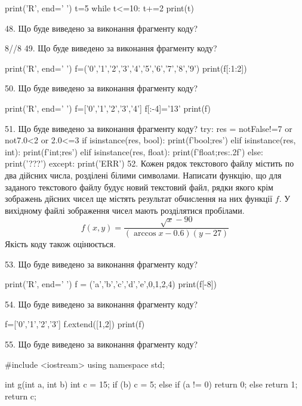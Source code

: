 \documentclass[11pt]{article}
\begin{document}
print('R', end=' ')
t=5
while t<=10:
    t+=2
print(t)

\vspace{5mm}
48. Що буде виведено за виконання фрагменту коду?

8//8%
\vspace{5mm}
49. Що буде виведено за виконання фрагменту коду?

print('R', end=' ')
f=('0','1','2','3','4','5','6','7','8','9')
print(f[:1:2])

\vspace{5mm}
50. Що буде виведено за виконання фрагменту коду?

print('R', end=' ')
f=['0','1','2','3','4']
f[:-4]='13'
print(f)

\vspace{5mm}
51. Що буде виведено за виконання фрагменту коду?
try:
    res = notFalse!=7 or not7.0<2 or 2.0<=3
    if isinstance(res, bool):
        print(f'bool;{res}')
    elif isinstance(res, int):
        print(f'int;{res}')
    elif isinstance(res, float):
        print(f'float;{res:.2f}')
    else:
        print('???')
except:
    print('ERR')
\vspace{5mm}
52. 
Кожен рядок текстового файлу містить по два дійсних числа, розділені білими символами.
Написати функцію, що для заданого текстового файлу будує новий текстовий файл, рядки якого крім зображень дйсних чисел ще містять результат обчислення на них функції $f$. У вихідному файлі зображення чисел мають розділятися пробілами. 
$$f(x, y) =\frac{\sqrt x - 90}{(\arccos x - 0.6) (y - 27)}$$ 
Якість коду також оцінюється.

\vspace{5mm}
53. Що буде виведено за виконання фрагменту коду?

print('R', end=' ')
f = ('a','b','c','d','e',0,1,2,4)
print(f[-8])

\vspace{5mm}
54. Що буде виведено за виконання фрагменту коду?

f=['0','1','2','3']
f.extend([1,2])
print(f)

\vspace{5mm}
55. Що буде виведено за виконання фрагменту коду?

#include <iostream>
using namespace std;

int g(int a, int b){
    int c = 15;
    if (b)
        c = 5;
    else if (a != 0)
         return 0;
    else 
        return 1;
    return c;
}
\end{document}
